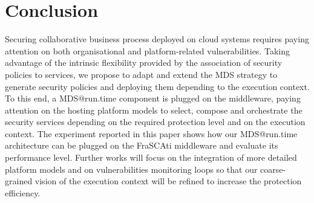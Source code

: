 \documentclass[runningheads,a4paper]{llncs}
\begin{document}
\section{Conclusion}
Securing collaborative business process deployed on cloud systems requires paying attention on both organisational and platform-related vulnerabilities. Taking advantage of the intrinsic flexibility provided by the association of security policies to services, we propose to adapt and extend the MDS strategy to generate security policies and deploying them depending to the execution context. To this end, a MDS@run.time component is plugged on the middleware, paying attention on the hosting platform models to select, compose and orchestrate the security services depending on the required protection level and on the execution context.  The experiment reported in this paper shows how our MDS@run.time architecture can be plugged on the FraSCAti middleware and evaluate its performance level.
Further works will focus on the integration of more detailed platform models and on vulnerabilities monitoring loops so that our coarse-grained vision of the execution context will be refined to increase the protection efficiency.



 
  
\end{document}
